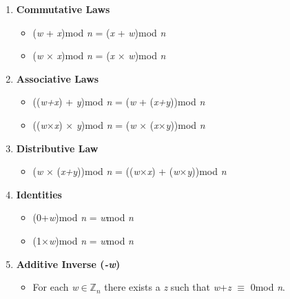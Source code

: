 \documentclass[iwp,first]{luthesis}
\begin{document}
\begin{enumerate}
\item \textbf{Commutative Laws}

\begin{itemize}

\item (\textit{w} + \textit{x})mod \textit{n} = (\textit{x} + \textit{w})mod \textit{n}
\item (\textit{w} $\times$ \textit{x})mod \textit{n} = (\textit{x} $\times$ \textit{w})mod \textit{n}

\end{itemize}

\item \textbf{Associative Laws}

\begin{itemize}

\item ((\textit{w+x}) + \textit{y})mod \textit{n} = (\textit{w} + (\textit{x+y}))mod \textit{n}
\item ((\textit{w$\times$x}) $\times$ \textit{y})mod \textit{n} = (\textit{w} $\times$ (\textit{x$\times$y}))mod \textit{n}

\end{itemize}

\item \textbf{Distributive Law}

\begin{itemize}

\item (\textit{w} $\times$ (\textit{x+y}))mod \textit{n} = ((\textit{w$\times$x}) + (\textit{w$\times$y}))mod \textit{n}

\end{itemize}

\item \textbf{Identities}

\begin{itemize}

\item (0+\textit{w})mod \textit{n} = \textit{w}mod \textit{n}
\item (1$\times$\textit{w})mod \textit{n} = \textit{w}mod \textit{n}

\end{itemize}

\item \textbf{Additive Inverse (\textit{-w})}

\begin{itemize}

\item For each \textit{w}$\in\mathbb{Z}_n$ there exists a \textit{z} such that \textit{w}+\textit{z} $\equiv$ 0mod \textit{n}.

\end{itemize}

\end{enumerate}
\end{document}
